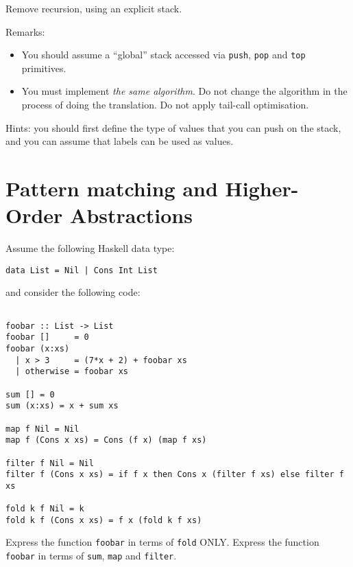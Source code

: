 \documentclass{article}
\newcommand{\answer}[1]{}
\begin{document}
Remove recursion, using an explicit stack. 

Remarks:

\begin{itemize}
\item  You should assume a ``global'' stack accessed via \texttt{push},
  \texttt{pop} and \texttt{top} primitives.

\item You must implement \emph{the same algorithm}. Do not change the
  algorithm in the process of doing the translation. Do not apply
  tail-call optimisation.
\end{itemize}

Hints: you should first define the type of values that you can push on
the stack, and you can assume that labels can be used as values.

\answer{
Stack frame: (n:Int,tmp:Int,caller:Pointer)

fib:
  if top.n == 0
     result = 0;
     goto top.caller
  else if top.n == 1
     result = 1
     goto top.caller
  else
     push (n-1,X,ret1)
     goto fib
ret1:
     pop;
     top.tmp = result;
     push (n-2,X,ret2);
     goto fib;
ret2:
     pop;
     result := result + top.tmp;
     goto top.caller;  
}

\newpage
\section{Pattern matching and Higher-Order Abstractions}

Assume the following Haskell data type:
\begin{verbatim}
data List = Nil | Cons Int List
\end{verbatim}
and consider the following code:
\begin{verbatim}

foobar :: List -> List
foobar []     = 0
foobar (x:xs)
  | x > 3     = (7*x + 2) + foobar xs
  | otherwise = foobar xs

sum [] = 0
sum (x:xs) = x + sum xs

map f Nil = Nil
map f (Cons x xs) = Cons (f x) (map f xs)

filter f Nil = Nil
filter f (Cons x xs) = if f x then Cons x (filter f xs) else filter f xs

fold k f Nil = k
fold k f (Cons x xs) = f x (fold k f xs)
\end{verbatim}

Express the function \texttt{foobar} in terms of \texttt{fold} ONLY.
Express the function \texttt{foobar} in terms of \texttt{sum}, \texttt{map} and \texttt{filter}.
\end{document}
